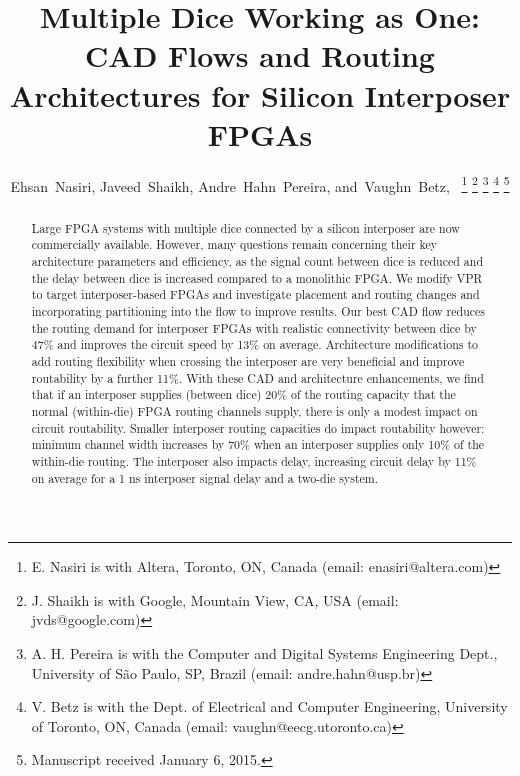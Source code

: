 \documentclass[journal]{IEEEtran}
\begin{document}
%
\title{Multiple Dice Working as One: CAD Flows and Routing Architectures for Silicon Interposer FPGAs}
%
%
%

\author{
		Ehsan~Nasiri,
		Javeed~Shaikh,
		Andre~Hahn~Pereira,
        and~Vaughn~Betz,~%
\thanks{E. Nasiri is with Altera, Toronto, ON, Canada (email: enasiri@altera.com)}%
\thanks{J. Shaikh is with Google, Mountain View, CA, USA (email: jvds@google.com)}%
\thanks{A. H. Pereira is with the Computer and Digital Systems Engineering Dept., University of S\~{a}o Paulo, SP, Brazil (email: andre.hahn@usp.br)}%
\thanks{V. Betz is with the Dept. of Electrical and Computer Engineering, University of Toronto, ON, Canada (email: vaughn@eecg.utoronto.ca)}%
\thanks{Manuscript received January 6, 2015.}}


\maketitle

\begin{abstract}
Large FPGA systems with multiple dice connected by a silicon interposer are now commercially available. However, many questions remain concerning their key architecture parameters and efficiency, as the signal count between dice is reduced and the delay between dice is increased compared to a monolithic FPGA. We modify VPR to target interposer-based FPGAs and investigate placement and routing changes and incorporating partitioning into the flow to improve results. Our best CAD flow reduces the routing demand for interposer FPGAs with realistic connectivity between dice by 47\% and improves the circuit speed by 13\% on average. Architecture modifications to add routing flexibility when crossing the interposer are very beneficial and improve routability by a further 11\%. With these CAD and architecture enhancements, we find that if an interposer supplies (between dice) 20\% of the routing capacity that the normal (within-die) FPGA routing channels supply, there is only a modest impact on circuit routability. Smaller interposer routing capacities do impact routability however: minimum channel width increases by 70\% when an interposer supplies only 10\% of the within-die routing. The interposer also impacts delay, increasing circuit delay by 11\% on average for a 1 ns interposer signal delay and a two-die system.
\end{abstract}
\end{document}
